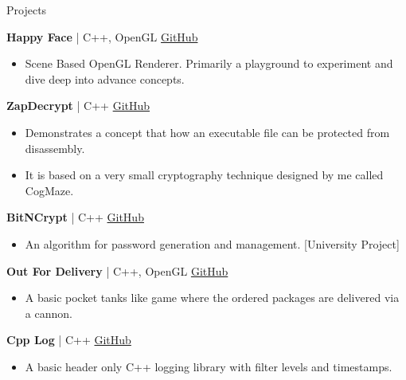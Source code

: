 \documentclass{resume}
\begin{document}
\begin{rSection}{Projects}
\vspace{-1em}

\item \textbf{Happy Face} | {C++, OpenGL} \hfill \href{https://github.com/JayNakum/HappyFace}{GitHub}
\begin{itemize}
    \item Scene Based OpenGL Renderer. Primarily a playground to experiment and dive deep into advance concepts.
 \end{itemize}

 \item \textbf{ZapDecrypt} | {C++} \hfill \href{https://github.com/JayNakum/ZapDecrypt}{GitHub}
\begin{itemize}
    \item Demonstrates a concept that how an executable file can be protected from disassembly. 
    \item It is based on a very small cryptography technique designed by me called CogMaze.
 \end{itemize}

 \item \textbf{BitNCrypt} | {C++} \hfill \href{https://github.com/JayNakum/BitNCrypt}{GitHub}
\begin{itemize}
    \item  An algorithm for password generation and management. [University Project]
 \end{itemize}

\item \textbf{Out For Delivery} | {C++, OpenGL} \hfill \href{https://github.com/JayNakum/OutForDelivery}{GitHub}
\begin{itemize}
    \item A basic pocket tanks like game where the ordered packages are delivered via a cannon.
 \end{itemize}


\item \textbf{Cpp Log} | {C++} \hfill \href{https://github.com/JayNakum/CppLog}{GitHub}
\begin{itemize}
    \item A basic header only C++ logging library with filter levels and timestamps.
 \end{itemize}


\end{rSection}
\end{document}
